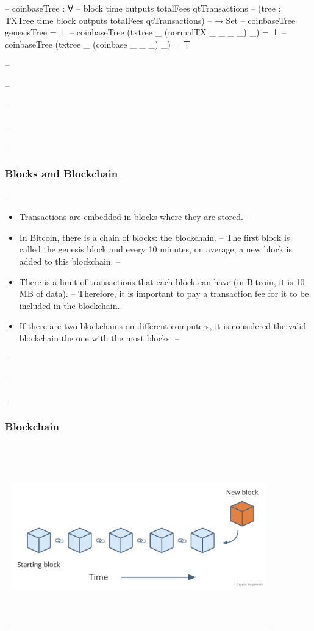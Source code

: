 \documentclass{beamer}
\begin{document}
{\begin{code}
--       coinbaseTree : ∀
--         {block time outputs totalFees qtTransactions}
--         (tree : TXTree time block outputs totalFees qtTransactions)
--         → Set
--       coinbaseTree genesisTree = ⊥
--       coinbaseTree (txtree _ (normalTX _ _ _ _) _) = ⊥
--       coinbaseTree (txtree _ (coinbase _ _ _) _) = ⊤

-- \end{code}
-- }
-- %

-- \begin{frame}
--    \frametitle{Blocks and Blockchain}
--    \begin{itemize}[<+->]
--      \item Transactions are embedded in blocks where they are stored.
--      \item In Bitcoin, there is a chain of blocks: the blockchain.
--        The first block is called the genesis block and every 10 minutes, on average, a new block is added to this blockchain.
--      \item There is a limit of transactions that each block can have (in Bitcoin, it is 10 MB of data).
--        Therefore, it is important to pay a transaction fee for it to be included in the blockchain.
--      \item If there are two blockchains on different computers, it is considered the valid blockchain the one with the most blocks.
--    \end{itemize}
-- \end{frame}

-- \begin{frame}
-- \frametitle{Blockchain}
-- \includegraphics[width=11cm, height=8cm]{blockchain1}
-- \end{frame}
\end{document}
